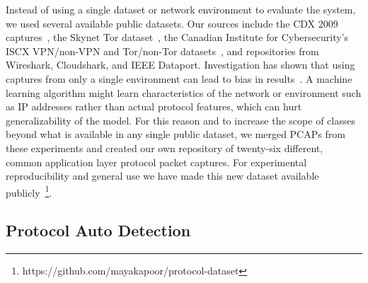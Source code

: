 Instead of using a single dataset or network environment to evaluate the system, we used several available public datasets. Our sources include the CDX 2009 captures~\cite{cdx2009}, the Skynet Tor dataset~\cite{skynet}, the Canadian Institute for Cybersecurity's ISCX VPN/non-VPN and Tor/non-Tor datasets~\cite{vpn-dataset, tor-dataset}, and repositories from Wireshark, Cloudshark, and IEEE Dataport. Investigation has shown that using captures from only a single environment can lead to bias in results~\cite{Silva2022}. A machine learning algorithm might learn characteristics of the network or environment such as IP addresses rather than actual protocol features, which can hurt generalizability of the model. For this reason and to increase the scope of classes beyond what is available in any single public dataset, we merged PCAPs from these experiments and created our own repository of twenty-six different, common application layer protocol packet captures. For experimental reproducibility and general use we have made this new dataset available publicly~\footnote{https://github.com/mayakapoor/protocol-dataset}.


\subsection{Protocol Auto Detection}

